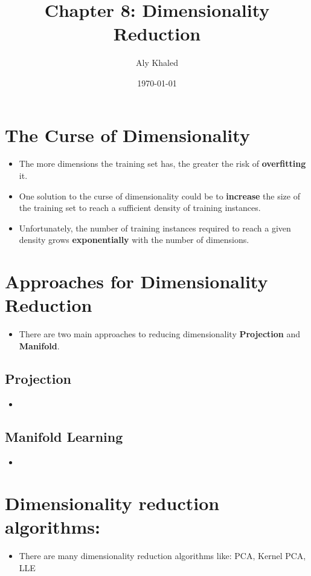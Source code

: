 \documentclass{article}
\title{Chapter 8: Dimensionality Reduction}
\author{Aly Khaled}
\date{\today}
\begin{document}
 
    \maketitle
    \section{The Curse of Dimensionality}
    \begin{itemize}
    	\item The more dimensions the training set has, the greater the risk of \textbf{overfitting} it.
    	\item One solution to the curse of dimensionality could be to \textbf{increase} the size of the training set to reach a sufficient density of training instances.
    	\item Unfortunately, the number of training instances required to reach a given density grows \textbf{exponentially} with the number of dimensions.
    \end{itemize}
    \section{Approaches for Dimensionality Reduction}
    \begin{itemize}
    	\item There are two main approaches to reducing dimensionality \textbf{Projection} and \textbf{Manifold}.
	\end{itemize}
	\subsection{Projection}
	\begin{itemize}
		\item 
	\end{itemize}	        
	\subsection{Manifold Learning}
	\begin{itemize}
		\item 
	\end{itemize}
	\section{Dimensionality reduction algorithms:}	
	\begin{itemize}
		\item There are many dimensionality reduction algorithms like: PCA, Kernel PCA, LLE
	\end{itemize}
\end{document}

